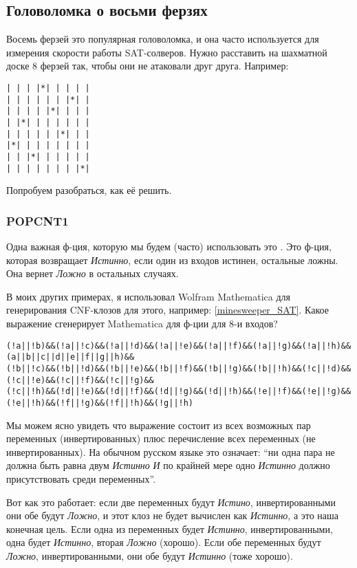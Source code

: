 \subsection{Головоломка о восьми ферзях}
\label{EightQueens}

Восемь ферзей это популярная головоломка, и она часто используется для измерения скорости работы SAT-солверов.
Нужно расставить на шахматной доске 8 ферзей так, чтобы они не атаковали друг друга.
Например:

\begin{lstlisting}
| | | |*| | | | |
| | | | | | |*| |
| | | | |*| | | |
| |*| | | | | | |
| | | | | |*| | |
|*| | | | | | | |
| | |*| | | | | |
| | | | | | | |*|
\end{lstlisting}

Попробуем разобраться, как её решить.

\subsubsection{POPCNT1}

Одна важная ф-ция, которую мы будем (часто) использовать это .
Это ф-ция, которая возвращает \textit{Истинно}, если один из входов истинен, остальные ложны.
Она вернет \textit{Ложно} в остальных случаях.

В моих других примерах, я использовал Wolfram Mathematica для генерирования CNF-клозов для этого, например: \ref{minesweeper_SAT}.
Какое выражение сгенерирует Mathematica для ф-ции  для 8-и входов?

\begin{lstlisting}
(!a||!b)&&(!a||!c)&&(!a||!d)&&(!a||!e)&&(!a||!f)&&(!a||!g)&&(!a||!h)&&(a||b||c||d||e||f||g||h)&&
(!b||!c)&&(!b||!d)&&(!b||!e)&&(!b||!f)&&(!b||!g)&&(!b||!h)&&(!c||!d)&&(!c||!e)&&(!c||!f)&&(!c||!g)&&
(!c||!h)&&(!d||!e)&&(!d||!f)&&(!d||!g)&&(!d||!h)&&(!e||!f)&&(!e||!g)&&(!e||!h)&&(!f||!g)&&(!f||!h)&&(!g||!h)
\end{lstlisting}

Мы можем ясно увидеть что выражение состоит из всех возможных пар переменных (инвертированных) плюс
перечисление всех переменных (не инвертированных).
На обычном русском языке это означает: ``ни одна пара не должна быть равна двум \textit{Истинно} \textit{И}
по крайней мере одно \textit{Истинно} должно
присутствовать среди переменных''.

Вот как это работает: если две переменных будут \textit{Истино}, инвертированными они обе будут \textit{Ложно},
и этот клоз не будет
вычислен как \textit{Истинно}, а это наша конечная цель.
Если одна из переменных будет \textit{Истинно}, инвертированными, одна будет \textit{Истинно},
вторая \textit{Ложно} (хорошо).
Если обе переменных будут \textit{Ложно}, инвертированными, они обе будут \textit{Истинно} (тоже хорошо).

